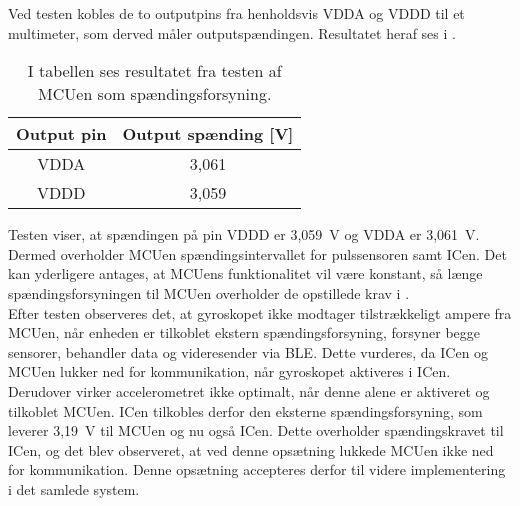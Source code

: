 Ved testen kobles de to outputpins fra henholdsvis VDDA og VDDD til et multimeter, som derved måler outputspændingen. Resultatet heraf ses i .
\begin{table}[H]
	\centering
	\begin{tabular}{cc}
		\hline
		\cellcolor[HTML]{C0C0C0} Output pin & \cellcolor[HTML]{C0C0C0} Output spænding {[}V{]} \\ \hline
		VDDA & 3,061 \\ \hline
		VDDD & 3,059  \\ \hline
	\end{tabular}
	\caption{I tabellen ses resultatet fra testen af MCUen som spændingsforsyning.}
	\label{tab:IC_spaending}
\end{table}\vspace{-0.25cm}
Testen viser, at spændingen på pin VDDD er 3,059~V og VDDA er 3,061~V. Dermed overholder MCUen spændingsintervallet for pulssensoren samt ICen. Det kan yderligere antages, at MCUens funktionalitet vil være konstant, så længe spændingsforsyningen til MCUen overholder de opstillede krav i .\\
Efter testen observeres det, at gyroskopet ikke modtager tilstrækkeligt ampere fra MCUen, når enheden er tilkoblet ekstern spændingsforsyning, forsyner begge sensorer, behandler data og videresender via BLE. Dette vurderes, da ICen og MCUen lukker ned for kommunikation, når gyroskopet aktiveres i ICen. Derudover virker accelerometret ikke optimalt, når denne alene er aktiveret og tilkoblet MCUen. ICen tilkobles derfor den eksterne spændingsforsyning, som leverer 3,19~V til MCUen og nu også ICen. Dette overholder spændingskravet til ICen, og det blev observeret, at ved denne opsætning lukkede MCUen ikke ned for kommunikation. Denne opsætning accepteres derfor til videre implementering i det samlede system.